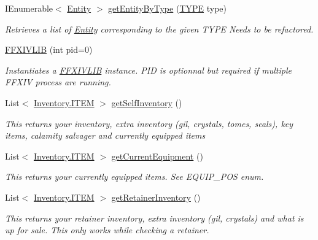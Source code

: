 \begin{DoxyCompactItemize}
I\-Enumerable$<$ \hyperlink{classffxivlib_1_1_entity}{Entity} $>$ \hyperlink{classffxivlib_1_1_f_f_x_i_v_l_i_b_a5defd75dc15eee11ca1c0e4d3dc8fac3}{get\-Entity\-By\-Type} (\hyperlink{namespaceffxivlib_aaa4e86d1ea6dbc1661147e6616256e68}{T\-Y\-P\-E} type)
\begin{DoxyCompactList}\small\item\em Retrieves a list of \hyperlink{classffxivlib_1_1_entity}{Entity} corresponding to the given T\-Y\-P\-E Needs to be refactored. \end{DoxyCompactList}\item 
\hyperlink{classffxivlib_1_1_f_f_x_i_v_l_i_b_ac9deecbc7f2ceeac2b48b06620e8a665}{F\-F\-X\-I\-V\-L\-I\-B} (int pid=0)
\begin{DoxyCompactList}\small\item\em Instantiates a \hyperlink{classffxivlib_1_1_f_f_x_i_v_l_i_b}{F\-F\-X\-I\-V\-L\-I\-B} instance. P\-I\-D is optionnal but required if multiple F\-F\-X\-I\-V process are running. \end{DoxyCompactList}\item 
List$<$ \hyperlink{structffxivlib_1_1_inventory_1_1_i_t_e_m}{Inventory.\-I\-T\-E\-M} $>$ \hyperlink{classffxivlib_1_1_f_f_x_i_v_l_i_b_adeabe7f254cb3ad228f1fee754f6b5d1}{get\-Self\-Inventory} ()
\begin{DoxyCompactList}\small\item\em This returns your inventory, extra inventory (gil, crystals, tomes, seals), key items, calamity salvager and currently equipped items \end{DoxyCompactList}\item 
List$<$ \hyperlink{structffxivlib_1_1_inventory_1_1_i_t_e_m}{Inventory.\-I\-T\-E\-M} $>$ \hyperlink{classffxivlib_1_1_f_f_x_i_v_l_i_b_a8d3e897ef9b983484e479e237da9a424}{get\-Current\-Equipment} ()
\begin{DoxyCompactList}\small\item\em This returns your currently equipped items. See E\-Q\-U\-I\-P\-\_\-\-P\-O\-S enum. \end{DoxyCompactList}\item 
List$<$ \hyperlink{structffxivlib_1_1_inventory_1_1_i_t_e_m}{Inventory.\-I\-T\-E\-M} $>$ \hyperlink{classffxivlib_1_1_f_f_x_i_v_l_i_b_a08fba89890835ec84967ba636759c9db}{get\-Retainer\-Inventory} ()
\begin{DoxyCompactList}\small\item\em This returns your retainer inventory, extra inventory (gil, crystals) and what is up for sale. This only works while checking a retainer. \end{DoxyCompactList}\item 

\end{DoxyCompactItemize}
